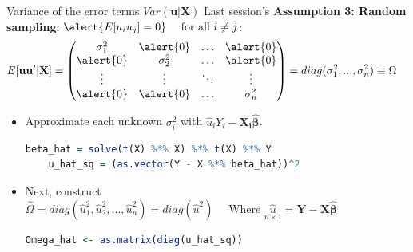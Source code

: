 \documentclass[11pt, aspectratio = 169]{beamer}
\begin{document}
\begin{frame}[fragile]{Variance of the error terms $Var(\mathbf{u}|\mathbf{X})$}
Last session's \textbf{Assumption 3: Random sampling}: $\alert{E[u_{i}u_{j}] = 0} \quad \text{ for all } i \neq j$:
\pause  
\begin{align*}
  E[\mathbf{u}\mathbf{u}'|\mathbf{X}] &=
 \begin{pmatrix}
\sigma_1^2 & \alert{0}        & \ldots & \alert{0}     \\
\alert{0}        & \sigma_2^2 & \ldots & \alert{0}     \\
\vdots   & \vdots   & \ddots & \vdots \\
\alert{0}        &  \alert{0}       & \ldots & \sigma_n^2 \\
\end{pmatrix} = diag(\sigma_1^2, ..., \sigma_n^2) \equiv \Omega
\end{align*}
\pause
\begin{itemize}
  \item Approximate each unknown $\sigma_i^2$ with $\hat{u}_i Y_i - \mathbf{X_i}\hat{\boldsymbol{\beta}}$.
  \begin{lstlisting}[language=R]      
    beta_hat = solve(t(X) %*% X) %*% t(X) %*% Y
    u_hat_sq = (as.vector(Y - X %*% beta_hat))^2
  \end{lstlisting}  
  \pause
  \item Next, construct $\widehat{\Omega} = diag(\hat{u}_1^2, \hat{u}_2^2, ..., \hat{u}_n^2) = diag(\hat{u}^2) \quad \text{ Where } \underset{n \times 1}{\hat{u}} = \mathbf{Y} - \mathbf{X}\hat{\boldsymbol{\beta}}$
  \vspace{+0.2cm}
  \begin{lstlisting}[language=R]      
    Omega_hat <- as.matrix(diag(u_hat_sq))
  \end{lstlisting}
\end{itemize}
\end{frame}
\end{document}
